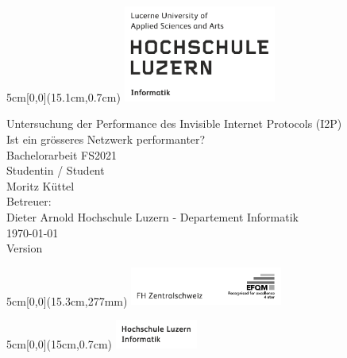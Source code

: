 \begin{titlepage}
	\begin{textblock*}{5cm}[0,0](15.1cm,0.7cm)
		\includegraphics[keepaspectratio,width=5cm]{img/HSLU_Logo}
	\end{textblock*}
	\begin{center}
		\vspace*{5cm}
        \Huge{Untersuchung der Performance des Invisible Internet Protocols (I2P)\textbf{}} \\
		\Large{Ist ein grösseres Netzwerk performanter?}\\
		\vspace{0.5em}
		\Large{Bachelorarbeit FS2021}\\
		\vspace{3em}
		\LARGE{Studentin / Student}\\
		\LARGE{Moritz Küttel}\\
		\vspace{1em}
		\Large{Betreuer:}\\
        \large{Dieter Arnold}
		\vfill
		\large{Hochschule Luzern - Departement Informatik}\\
		\large{\today}\\
		\large{Version \docversion}
	\end{center}
	\begin{textblock*}{5cm}[0,0](15.3cm,277mm)
		\includegraphics[keepaspectratio,width=5cm]{img/FHZ_Logo}
	\end{textblock*}
\end{titlepage}

\newpage


\begin{textblock*}{5cm}[0,0](15cm,0.7cm)
	\includegraphics[keepaspectratio,width=2.7cm]{img/HSLU_Logo_Header}
\end{textblock*}

